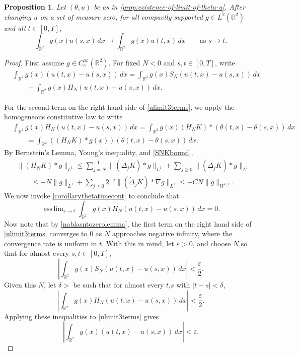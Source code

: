 \documentclass[11pt,reqno,xcolor=svgnames]{amsart}
\def\R{{\mathbb R}}
\theoremstyle{plain}
\newtheorem{prop}[theorem]{Proposition}
\theoremstyle{definition}
\theoremstyle{plain}
\theoremstyle{remark}
\newcommand{\abs}[1]{\left\vert#1\right\vert}
\newcommand{\esslim}{\mathop{\mathrm{ess\,lim}}}
\renewcommand{\epsilon}{\varepsilon}
\newcommand{\Del}{\dot{\Delta}}
\begin{document}
\begin{prop}\label{P:WeakTimeContinuityofu}
Let $(\theta,u)$ be as in \cref{prop:existence-of-limit-of-theta-u}.  After changing $u$ on a set of measure zero,  
for all compactly supported $g\in L^2(\R^2)$ and all $t\in [0,T]$, 
$$  \int_{\R^2} g(x) u(s,x) \, dx \rightarrow \int_{\R^2} g(x)u(t,x) \, dx \qquad \text{as }s\rightarrow t.$$
\end{prop}

\begin{proof}
First assume $g \in C^{\infty}_c(\R^2)$.  For fixed $N<0$ and $s,t\in[0,T]$, write 
\begin{equation}\label{ulimit3terms}
\begin{split}
&\int_{\R^2} g(x) (u(t,x)-u(s,x)) \, dx =   \int_{\R^2}g(x) S_N (u(t,x)-u(s,x)) \, dx\\
&\qquad + \int_{\R^2} g(x) H_N (u(t,x)-u(s,x)) \, dx.
\end{split}
\end{equation}
  

For the second term on the right hand side of \cref{ulimit3terms}, we apply the homogeneous constitutive law to write
\begin{equation*}
\begin{split}
&\int_{\R^2} g(x) H_N (u(t,x)-u(s,x)) \, dx = \int_{\R^2}g(x) (H_NK)\ast (\theta(t,x)-\theta(s,x)) \, dx  \\
&\qquad = \int_{\R^2} ((H_NK)\ast g(x))  (\theta(t,x)-\theta(s,x)) \, dx.
\end{split} 
\end{equation*}
By Bernstein's Lemma,  Young's inequality, and \cref{SNKbound},
\begin{equation}
\begin{split}
&\| (H_NK)\ast g \|_{L^1} \leq \sum_{j=N}^{-1} \| (\Del_jK)\ast g \|_{L^1} + \sum_{j\geq 0} \| (\Del_jK)\ast g \|_{L^1} \\
&\qquad \leq -N \|g \|_{L^1} + \sum_{j\geq 0} 2^{-j}\| (\Del_jK)\ast \nabla g \|_{L^1} \leq -CN\| g \|_{W^{1,1}}.
\end{split}
\end{equation}
We now invoke \cref{corollarythetatimecont} to conclude that
$$ \esslim_{s\rightarrow t} \int_{\R^2} g(x) H_N (u(t,x) - u(s,x)) \, dx = 0.$$
Now note that by \cref{nablasntozerolemma}, the first term on the right hand side of \cref{ulimit3terms} converges to $0$ as $N$ approaches negative infinity, where the convergence rate is uniform in $t$.  With this in mind, let $\epsilon>0$, and choose $N$ so that for almost every $s,t\in [0,T]$, 
\begin{equation*}
\abs{\int_{\R^2} g(x) S_N (u(t,x)-u(s,x)) \, dx} < \frac{\epsilon}{2}.
\end{equation*}
Given this $N$, let $\delta>$ be such that for almost every $t$,$s$ with $|t-s|<\delta$,
\begin{equation*}
\abs{\int_{\R^2} g(x) H_N (u(t,x) - u(s,x)) \, dx} < \frac{\epsilon}{2}.
\end{equation*}
Applying these inequalities to \cref{ulimit3terms} gives
$$\abs{\int_{\R^2} g(x) (u(t,x)-u(s,x)) \, dx}< \epsilon.$$


\end{proof}
\end{document}
